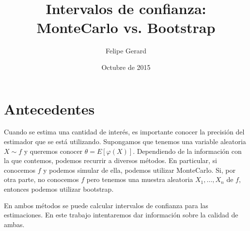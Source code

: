 \documentclass[11pt]{article}
\title{Intervalos de confianza: MonteCarlo vs. Bootstrap}
\author{Felipe Gerard}
\date{Octubre de 2015}
\begin{document}
\maketitle

\section*{Antecedentes}

Cuando se estima una cantidad de interés, es importante conocer la precisión del estimador que se está utilizando. Supongamos que tenemos una variable aleatoria $X \sim f$ y queremos conocer $\theta = E[\varphi(X)]$. Dependiendo de la información con la que contemos, podemos recurrir a diversos métodos. En particular, si conocemos $f$ y podemos simular de ella, podemos utilizar MonteCarlo. Si, por otra parte, no conocemos $f$ pero tenemos una muestra aleatoria $X_1, \dots, X_n$ de $f$, entonces podemos utilizar bootstrap.

En ambos métodos se puede calcular intervalos de confianza para las estimaciones. En este trabajo intentaremos dar información sobre la calidad de ambas.
\end{document}
